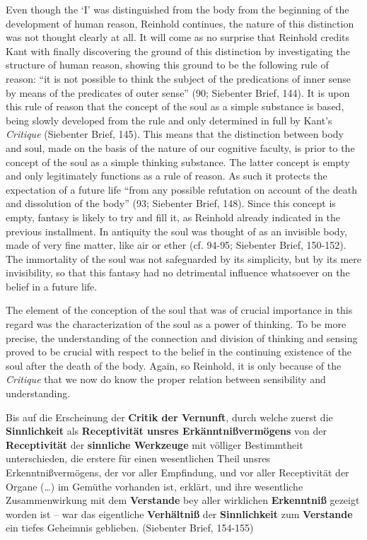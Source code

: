 Even though the `I' was distinguished from the body from the beginning of the development of human reason, Reinhold continues, the nature of this distinction was not thought clearly at all. It will come as no surprise that Reinhold credits Kant with finally discovering the ground of this distinction by investigating the structure of human reason, showing this ground to be the following rule of reason: ``it is not possible to think the subject of the predications of inner sense by means of the predicates of outer sense'' (90; Siebenter Brief, 144). It is upon this rule of reason that the concept of the soul as a simple substance is based, being slowly developed from the rule and only determined in full by Kant's \textit{Critique} (Siebenter Brief, 145). This means that the distinction between body and soul, made on the basis of the nature of our cognitive faculty, is prior to the concept of the soul as a simple thinking substance. The latter concept is empty and only legitimately functions as a rule of reason. As such it protects the expectation of a future life ``from any possible refutation on account of the death and dissolution of the body'' (93; Siebenter Brief, 148). Since this concept is empty, fantasy is likely to try and fill it, as Reinhold already indicated in the previous installment. In antiquity the soul was thought of as an invisible body, made of very fine matter, like air or ether (cf. 94{-}95; Siebenter Brief, 150{-}152). The immortality of the soul was not safeguarded by its simplicity, but by its mere invisibility, so that this fantasy had no detrimental influence whatsoever on the belief in a future life. 

 The element of the conception of the soul that was of crucial importance in this regard was the characterization of the soul as a power of thinking. To be more precise, the understanding of the connection and division of thinking and sensing proved to be crucial with respect to the belief in the continuing existence of the soul after the death of the body. Again, so Reinhold, it is only because of the \textit{Critique} that we now do know the proper relation between sensibility and understanding. 

Bis auf die Erscheinung der \textbf{Critik der Vernunft}, durch welche zuerst die \textbf{Sinnlichkeit }als \textbf{Receptivit\"{a}t unsres Erk\"{a}nntni\ss{}verm\"{o}gens} von der \textbf{Receptivit\"{a}t }der \textbf{sinnliche Werkzeuge} mit v\"{o}lliger Bestimmtheit unterschieden, die erstere f\"{u}r einen wesentlichen Theil unsres Erkenntni\ss{}verm\"{o}gens, der vor aller Empfindung, und vor aller Receptivit\"{a}t der Organe (\ldots ) im Gem\"{u}the vorhanden ist, erkl\"{a}rt, und ihre wesentliche Zusammenwirkung mit dem \textbf{Verstande} bey aller wirklichen \textbf{Erkenntni\ss{}} gezeigt worden ist {--} war das eigentliche \textbf{Verh\"{a}ltni\ss{}} der \textbf{Sinnlichkeit }zum \textbf{Verstande} ein tiefes Geheimnis geblieben. (Siebenter Brief, 154{-}155)

